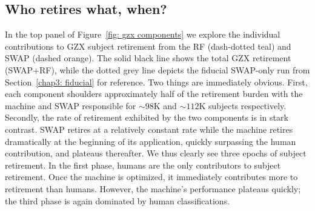 \subsection{Who retires what, when?}  

In the top panel of Figure~\ref{fig: gzx components} we explore the individual 
contributions to GZX subject retirement from the RF (dash-dotted teal) 
and SWAP (dashed orange). The solid black line shows the total GZX retirement (SWAP+RF), while the dotted grey line depicts the fiducial SWAP-only run from 
Section~\ref{chap3: fiducial} for reference. Two things are immediately obvious. First, each component shoulders approximately half of the retirement burden with the machine and SWAP responsible for $\sim$$98$K and $\sim$$112$K subjects respectively. Secondly, the rate of retirement exhibited by the two components is in stark contrast. SWAP retires at a relatively constant rate while the machine retires dramatically at the beginning of its application, quickly surpassing the human contribution, and plateaus thereafter. We thus clearly see three epochs of subject retirement. In the first phase, humans are the only contributors to subject retirement. Once the machine is optimized, it immediately contributes more to retirement than humans. However, the machine's performance plateaus quickly; the third phase is again dominated by human classifications.


